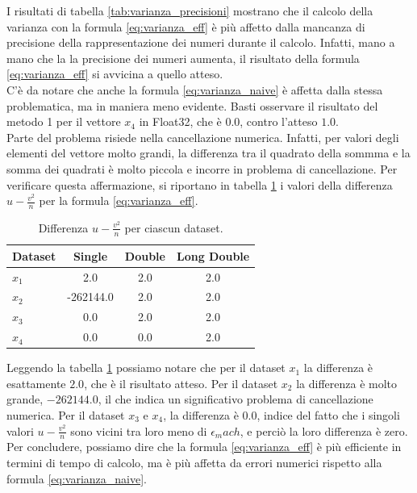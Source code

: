 \documentclass[letterpaper, 12pt]{article}
\begin{document}
I risultati di tabella \ref{tab:varianza_precisioni} mostrano che il calcolo della varianza con la formula 
\ref{eq:varianza_eff} è più affetto dalla mancanza di precisione della rappresentazione dei numeri durante il calcolo.
Infatti, mano a mano che la la precisione dei numeri aumenta, il risultato della formula \ref{eq:varianza_eff} 
si avvicina a quello atteso. \\
C'è da notare che anche la formula \ref{eq:varianza_naive} è affetta dalla stessa problematica, ma in maniera meno
evidente. Basti osservare il risultato del metodo 1 per il vettore $x_4$ in Float32, che è $0.0$, contro l'atteso 
$1.0$. \\
Parte del problema risiede nella cancellazione numerica. Infatti, per valori degli elementi del vettore molto grandi,
la differenza tra il quadrato della sommma e la somma dei quadrati è molto piccola e incorre in problema di
cancellazione. Per verificare questa affermazione, si riportano in tabella \ref{tab:errore_varianza} i valori della 
differenza \( u - \frac{v^2}{n} \)
per la formula \ref{eq:varianza_eff}.

\begin{table}[h!]
\centering
\caption{Differenza \( u - \frac{v^2}{n} \) per ciascun dataset.}
\label{tab:errore_varianza}
\begin{tabular}{|l|c|c|c|}
\hline
\textbf{Dataset} & \textbf{Single} & \textbf{Double} & \textbf{Long Double} \\
\hline
$x_1$ & 2.0       & 2.0 & 2.0 \\
$x_2$ & -262144.0 & 2.0 & 2.0 \\
$x_3$ & 0.0       & 2.0 & 2.0 \\
$x_4$ & 0.0       & 0.0 & 2.0 \\
\hline
\end{tabular}
\end{table}

Leggendo la tabella \ref{tab:errore_varianza} possiamo notare che per il dataset $x_1$ la differenza è esattamente
$2.0$, che è il risultato atteso. Per il dataset $x_2$ la differenza è molto grande, $-262144.0$, il che indica un
significativo problema di cancellazione numerica. Per il dataset $x_3$ e $x_4$, la differenza è $0.0$, indice 
del fatto che i singoli valori \( u - \frac{v^2}{n} \) sono vicini tra loro meno di $\epsilon_mach$, e perciò la 
loro differenza è zero. \\
Per concludere, possiamo dire che la formula \ref{eq:varianza_eff} è più efficiente in termini di tempo di calcolo,
ma è più affetta da errori numerici rispetto alla formula \ref{eq:varianza_naive}.
\end{document}
